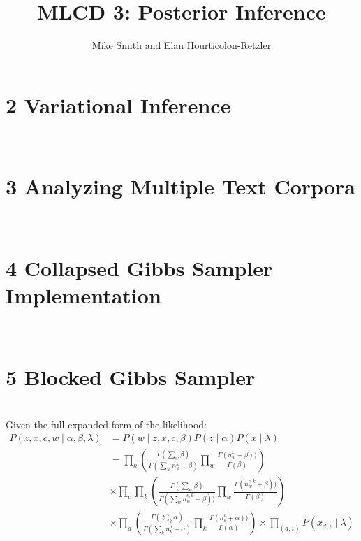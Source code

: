 \documentclass[12pt]{article}
\begin{document}
\title{MLCD 3: Posterior Inference}
\author{Mike Smith and Elan Hourticolon-Retzler}

\maketitle

\thispagestyle{empty}

\section*{2 Variational Inference}
\\

\section*{3 Analyzing Multiple Text Corpora}
\\

\section*{4 Collapsed Gibbs Sampler Implementation}
\\

\section*{5 Blocked Gibbs Sampler}
\\
Given the full expanded form of the likelihood:\\
\begin{align}
P (z, x, c, w\mid \alpha, \beta, \lambda) &= P (w \mid z, x, c, \beta)P (z\mid \alpha)P(x\mid \lambda) \nonumber\\
&=\prod_{k}(\frac{\Gamma(\sum_{w} \beta)}{\Gamma(\sum_{w} n^{k}_{w}+\beta)} \prod_{w} \frac{\Gamma(n^{k}_{w}+\beta))}{\Gamma(\beta)} )\nonumber\\
&\times \prod_{c}\prod_{k}(\frac{\Gamma(\sum_{w} \beta)}{\Gamma(\sum_{w} n^{c,k}_{w}+\beta))} \prod_{w} \frac{\Gamma(n^{c,k}_{w}+\beta))}{\Gamma(\beta)} )\nonumber\\
&\times \prod_{d}(\frac{\Gamma(\sum_{k} \alpha)}{\Gamma(\sum_{k} n^{d}_{k}+\alpha)} \prod_{k} \frac{\Gamma(n^{d}_{k}+\alpha))}{\Gamma(\alpha)} ) \times \prod_{(d,i)} P(x_{d,i} \mid \lambda)\nonumber\\
\end{align}
\end{document}
